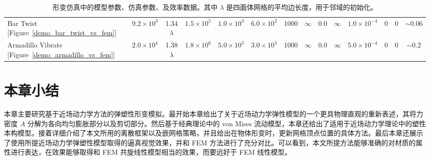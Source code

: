 \begin{table}[htb]
{{\begin{tabular}{lccccccccccccc}
  Bar Twist [Figure~\ref{demo_bar_twist_vs_fem}]     & $9.2\times10^3$ & 1.34 $\lambda$ & $1.5\times10^5$ & $1.0\times10^3$   & $6.0\times10^2$          & 1000 & $\infty $ & 0.0             & $\infty$ & $1.0\times10^{-4}$ &0&0& $\sim0.06$ \\
  Armadillo Vibrate [Figure~\ref{demo_armadillo_vs_fem}]     & $2.0\times10^4$ & 1.38 $\lambda$ & $1.8\times10^6$ & $5.0\times10^3$   & $3.0\times10^3$          & 1000 & $\infty $ & 0.0             & $\infty$ & $5.0\times10^{-4}$ &0&0& $\sim0.2$ \\
  \hline
\end{tabular}
}
}
\caption{形变仿真中的模型参数、仿真参数、及效率数据。其中 $\lambda$ 是四面体网格的平均边长度，用于邻域的初始化。}
\label{deformation_results_table}
\end{table}

\section{本章小结}
本章主要研究基于近场动力学方法的弹塑性形变模拟。最开始本章给出了关于近场动力学弹性模型的一个更具物理直观的重新表述，其将力密度 $A$ 分解为各向均匀膨胀部分以及剪切部分。然后基于经典理论中的 von Mises 流动模型，本章还给出了适用于近场动力学理论中的塑性本构模型。接着详细介绍了本文所用的离散框架以及嵌网格策略，并且给出在物体形变时，更新网格顶点位置的具体方法。最后本章还展示了使用所提近场动力学弹塑性模型取得的逼真视觉效果，并和 FEM 方法进行了充分对比。可以看到，本文所提方法能够准确的对材质的属性进行表达，在效果能够取得和 FEM 共旋线性模型相当的效果，而要远好于 FEM 线性模型。

